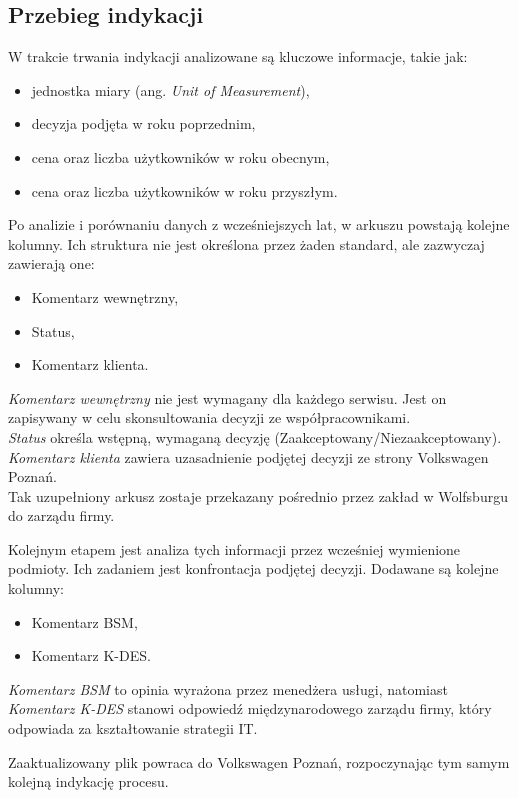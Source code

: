 \subsection{Przebieg indykacji}
W trakcie trwania indykacji analizowane są kluczowe informacje, takie jak:
\begin{itemize}
    \item jednostka miary (ang. \emph{Unit of Measurement}),
    \item decyzja podjęta w roku poprzednim,
    \item cena oraz liczba użytkowników w roku obecnym,
    \item cena oraz liczba użytkowników w roku przyszłym.
\end{itemize}
Po analizie i porównaniu danych z wcześniejszych lat, w arkuszu powstają kolejne kolumny. Ich struktura nie jest określona przez żaden standard, ale zazwyczaj zawierają one:
\begin{itemize}
    \item Komentarz wewnętrzny,
    \item Status,
    \item Komentarz klienta.
\end{itemize}

\noindent\emph{Komentarz wewnętrzny} nie jest wymagany dla każdego serwisu. Jest on zapisywany w celu skonsultowania decyzji ze współpracownikami.\\ \emph{Status} określa wstępną, wymaganą decyzję (Zaakceptowany/Niezaakceptowany).\\ \emph{Komentarz klienta} zawiera uzasadnienie podjętej decyzji ze strony Volkswagen Poznań.\\Tak uzupełniony arkusz zostaje przekazany pośrednio przez zakład w Wolfsburgu do zarządu firmy. \par
Kolejnym etapem jest analiza tych informacji przez wcześniej wymienione podmioty. Ich zadaniem jest konfrontacja podjętej decyzji. Dodawane są kolejne kolumny:
\begin{itemize}
    \item Komentarz BSM,
    \item Komentarz K-DES.
\end{itemize}

\noindent\emph{Komentarz BSM} to opinia wyrażona przez menedżera usługi, natomiast \emph{Komentarz K-DES} stanowi odpowiedź międzynarodowego zarządu firmy, który odpowiada za kształtowanie strategii IT.\par
Zaaktualizowany plik powraca do Volkswagen Poznań, rozpoczynając tym samym kolejną indykację procesu.





